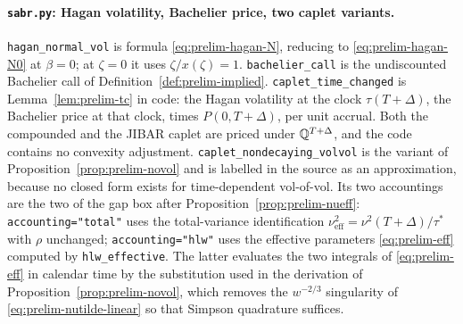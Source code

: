 \paragraph{\texttt{sabr.py}: Hagan volatility, Bachelier price, two caplet variants.}
\texttt{hagan\_normal\_vol} is formula \eqref{eq:prelim-hagan-N}, reducing to \eqref{eq:prelim-hagan-N0} at $\beta=0$; at $\zeta=0$ it uses $\zeta/x(\zeta)=1$. \texttt{bachelier\_call} is the undiscounted Bachelier call of Definition~\ref{def:prelim-implied}. \texttt{caplet\_time\_changed} is Lemma~\ref{lem:prelim-tc} in code: the Hagan volatility at the clock $\tau(T+\Delta)$, the Bachelier price at that clock, times $P(0,T+\Delta)$, per unit accrual. Both the compounded and the JIBAR caplet are priced under $\mathbb{Q}^{T+\Delta}$, and the code contains no convexity adjustment. \texttt{caplet\_nondecaying\_volvol} is the variant of Proposition~\ref{prop:prelim-novol} and is labelled in the source as an approximation, because no closed form exists for time-dependent vol-of-vol. Its two accountings are the two of the gap box after Proposition~\ref{prop:prelim-nueff}: \texttt{accounting="total"} uses the total-variance identification $\nu_{\mathrm{eff}}^2=\nu^2(T+\Delta)/\tau^*$ with $\rho$ unchanged; \texttt{accounting="hlw"} uses the effective parameters \eqref{eq:prelim-eff} computed by \texttt{hlw\_effective}. The latter evaluates the two integrals of \eqref{eq:prelim-eff} in calendar time by the substitution used in the derivation of Proposition~\ref{prop:prelim-novol}, which removes the $w^{-2/3}$ singularity of \eqref{eq:prelim-nutilde-linear} so that Simpson quadrature suffices.


